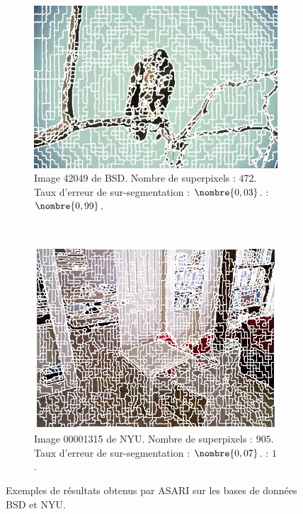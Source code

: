 \begin{figure}[htb]
        \centering
           \begin{subfigure}[t]{0.45\textwidth}
        \includegraphics[width=\textwidth]{images/asari/ASARI/BSDS500/42049}
        \caption{Image 42049 de BSD. Nombre de superpixels : $472$. Taux d'erreur de sur-segmentation : $\nombre{0,03}$.  : $\nombre{0,99}$.}
        \label{fig:asari-BSDS500-1}
        \end{subfigure}
        ~
       \begin{subfigure}[t]{0.4\textwidth}
      \includegraphics[width=\textwidth]{images/asari/ASARI/NYU/00001315}
        \caption{Image 00001315 de NYU. Nombre de superpixels : $905$. Taux d'erreur de sur-segmentation : $\nombre{0,07}$.  : $1$.}
        \label{fig:asari-NYU-1}
        \end{subfigure}
        \caption{Exemples de résultats obtenus par ASARI sur les bases de données BSD et NYU.}
        \label{fig:asari:BSD-NYU}
\end{figure}


